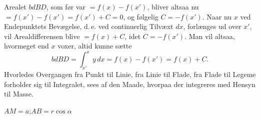 \documentclass[12pt]{book}
\newcommand{\opage}[1]{\marginnote{\footnotesize\textit{[#1]}}}
\begin{document}
Arealet $bdBD$, som før var $= f(x) - f(x')$, bliver altsaa nu
$= f(x') - f(x') = f(x') + C = 0$, og følgelig $C = -f(x')$. Naar nu
$x$ ved Endepunktets Bevægelse, d.\,e. ved continuerlig Tilvæxt $dx$,
forlænges ud over $x'$, vil Arealdifferensen blive $= f(x) + C$, idet
$C = -f(x')$. Man
\opage{83} vil altsaa, hvormeget end $x$ voxer, altid kunne
sætte
\[
bdBD = \int_{x'}^{x} y\,dx = f(x) - f(x') = f(x) + C.
\]
Hvorledes Overgangen fra Punkt til Linie, fra Linie til Flade, fra
Flade til Legeme forholder sig til Integralet, sees af den Maade,
hvorpaa der integreres med Hensyn til Masse.

\begin{center}

$AM = a$;\quad $AB = r\cos\alpha$
\end{center}
\end{document}
